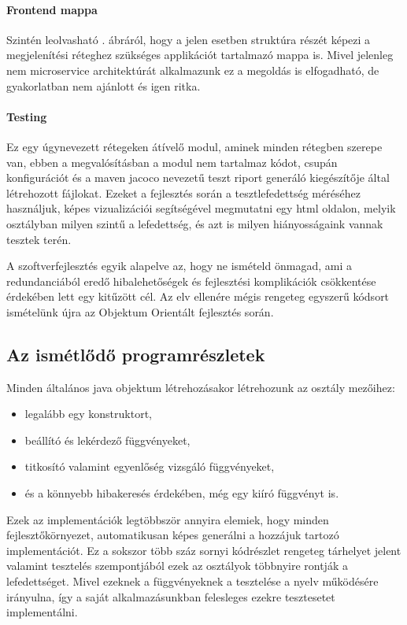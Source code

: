 \paragraph{Frontend mappa}
Szintén leolvasható . ábráról, hogy a jelen esetben struktúra részét képezi a megjelenítési réteghez szükséges applikációt tartalmazó mappa is. Mivel jelenleg nem microservice architektúrát alkalmazunk ez a megoldás is elfogadható, de gyakorlatban nem ajánlott és igen ritka.

\paragraph{Testing}
Ez egy úgynevezett rétegeken átívelő modul, aminek minden rétegben szerepe van, ebben a megvalósításban a modul nem tartalmaz kódot, csupán konfigurációt és a maven jacoco nevezetű teszt riport generáló kiegészítője által létrehozott fájlokat. Ezeket a fejlesztés során a tesztlefedettség méréséhez használjuk, képes vizualizációi segítségével megmutatni egy html oldalon, melyik osztályban milyen szintű a lefedettség, és azt is milyen hiányosságaink vannak tesztek terén.


A szoftverfejlesztés egyik alapelve az, hogy ne ismételd önmagad, ami a redundanciából eredő hibalehetőségek és fejlesztési komplikációk csökkentése érdekében lett egy kitűzött cél. Az elv ellenére mégis rengeteg egyszerű kódsort ismételünk újra az Objektum Orientált fejlesztés során.

\subsection{Az ismétlődő programrészletek}

Minden általános java objektum létrehozásakor létrehozunk az osztály mezőihez:
\begin{itemize}
	\item legalább egy konstruktort,
	\item beállító és lekérdező függvényeket,
	\item titkosító valamint egyenlőség vizsgáló függvényeket,
	\item és a könnyebb hibakeresés érdekében, még egy kiíró függvényt is.
\end{itemize}

Ezek az implementációk legtöbbször annyira elemiek, hogy minden fejlesztőkörnyezet, automatikusan képes generálni a hozzájuk tartozó implementációt. Ez a sokszor több száz sornyi kódrészlet rengeteg tárhelyet jelent valamint tesztelés szempontjából ezek az osztályok többnyire rontják a lefedettséget. Mivel ezeknek a függvényeknek a tesztelése a nyelv működésére irányulna, így a saját alkalmazásunkban felesleges ezekre tesztesetet implementálni.

